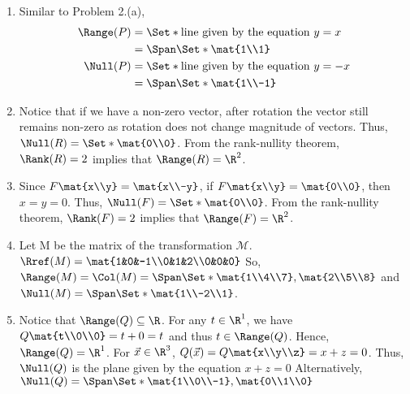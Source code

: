 \begin{exercises}
\begin{problist}
\begin{solution}
			\begin{enumerate}
				\item Similar to Problem 2.(a),
					\begin{align*}
					\Range(P)&=\Set*{\text{line given by the equation } y=x}\\
					&=\Span\Set*{\mat{1\\1}}\\
					\Null(P)&=\Set*{\text{line given by the equation } y=-x}\\
					&=\Span\Set*{\mat{1\\-1}}
					\end{align*}

				\item Notice that if we have a non-zero vector, after rotation
					the vector still remains non-zero as rotation does
					not change magnitude of vectors. Thus, $\Null(R)=\Set*{\mat{0\\0}}$.
					From the rank-nullity theorem, $\Rank(R) = 2$ implies that $\Range(R) = \R^{2}$.

				\item Since $F\mat{x\\y}= \mat{x\\-y}$, if $F\mat{x\\y}= \mat{0\\0}$, then $x=y=0$.
					Thus, $\Null(F)=\Set*{\mat{0\\0}}$. From the rank-nullity
					theorem, $\Rank(F)=2$ implies that $\Range(F)=\R^{2}$.

				\item Let M be the matrix of the transformation $\mathcal{M}$.
					$\Rref(M)= \mat{1&0&-1\\0&1&2\\0&0&0}$ So,
					$\Range(M)=\Col(M)=\Span\Set*{\mat{1\\4\\7},\mat{2\\5\\8}}$
					and $\Null(M)=\Span\Set*{\mat{1\\-2\\1}}$.

				\item Notice that $\Range(Q)\subseteq\R$. For any $t\in\R^{1}$, we have
					$Q\mat{t\\0\\0}=t+0=t$ and thus $t\in\Range(Q)$. Hence,
					$\Range(Q) = \R^{1}$. For $\vec x \in \R^{3}$, $Q(\vec
					x)=Q\mat{x\\y\\z}=x+z=0$.
					Thus, $\Null(Q)$ is the plane given by the equation
					$x+z=0$ Alternatively, $\Null(Q) = \Span\Set*{\mat{1\\0\\-1},\mat{0\\1\\0}}$
			\end{enumerate}
		\end{solution}


\end{problist}
\end{exercises}
